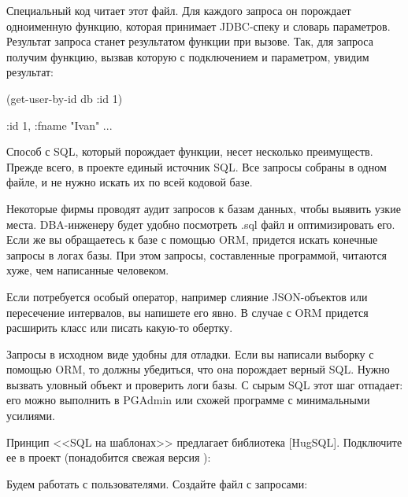 Специальный код читает этот файл. Для каждого запроса он порождает одноименную функцию, которая принимает JDBC-спеку и словарь параметров. Результат запроса станет результатом функции при вызове. Так, для запроса  получим функцию, вызвав которую с подключением и параметром, увидим результат:

\begin{english}
  \begin{clojure}
(get-user-by-id db {:id 1})

{:id 1, :fname "Ivan" ...}
  \end{clojure}
\end{english}

Способ с SQL, который порождает функции, несет несколько преимуществ. Прежде всего, в проекте единый источник SQL. Все запросы собраны в одном файле, и не нужно искать их по всей кодовой базе.

Некоторые фирмы проводят аудит запросов к базам данных, чтобы выявить узкие места. DBA-инженеру будет удобно посмотреть .sql файл и оптимизировать его. Если же вы обращаетесь к базе с помощью ORM, придется искать конечные запросы в логах базы. При этом запросы, составленные программой, читаются хуже, чем написанные человеком.

Если потребуется особый оператор, например слияние JSON-объектов или пересечение интервалов, вы напишете его явно. В случае с ORM придется расширить класс или писать какую-то обертку.

Запросы в исходном виде удобны для отладки. Если вы написали выборку с помощью ORM, то должны убедиться, что она порождает верный SQL. Нужно вызвать уловный объект  и проверить логи базы. С сырым SQL этот шаг отпадает: его можно выполнить в PGAdmin или схожей программе с минимальными усилиями.

\def\urlhugsqlorg{https://www.hugsql.org/}
\def\urlhugsqlgh{https://github.com/layerware/hugsql}

Принцип <<SQL на шаблонах>> предлагает библиотека \footurl{HugSQL}{\urlhugsqlorg}[HugSQL]. Подключите ее в проект (понадобится свежая версия ):

\begin{english}
  \begin{clojure}
  \end{clojure}
\end{english}

Будем работать с пользователями. Создайте файл  с запросами:

